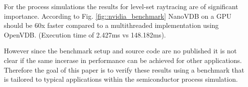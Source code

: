 For the process simulations the results for level-set raytracing are of significant importance. 
According to Fig. \ref{fig::nvidia_benchmark} NanoVDB on a GPU should be 60x faster compared to a multithreaded implementation using OpenVDB. (Execution time of 2.427ms vs 148.182ms).

However since the benchmark setup and source code are no published it is not clear if the same incerase in performance can be achieved for other applications.
Therefore the goal of this paper is to verify these results using a benchmark that is tailored to typical applications within the semiconductor process simulation.